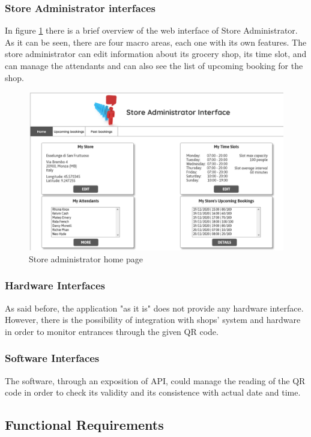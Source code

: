 \documentclass[table, 12pt]{article}
\begin{document}
\subsubsection{Store Administrator interfaces}
In figure \ref{mock_store_admin_home} there is a brief overview of the web interface of Store Administrator.\\
As it can be seen, there are four macro areas, each one with its own features. The store administrator can edit information about its grocery shop, its time slot, and can manage the attendants and can also see the list of upcoming booking for the shop.
\begin{figure}[H]
    \includegraphics[width=\textwidth]{assets/mock_home_store_admin_page.png}
    \caption{Store administrator home page}
    \label{mock_store_admin_home}
\end{figure}

\subsubsection{Hardware Interfaces}
As said before, the application "as it is" does not provide any hardware interface.\\
However, there is the possibility of integration with shops' system and hardware in order to monitor entrances through the given QR code.
\subsubsection{Software Interfaces}
The software, through an exposition of API, could manage the reading of the QR code in order to check its validity and its consistence with actual date and time.

\subsection{Functional Requirements}
\end{document}
